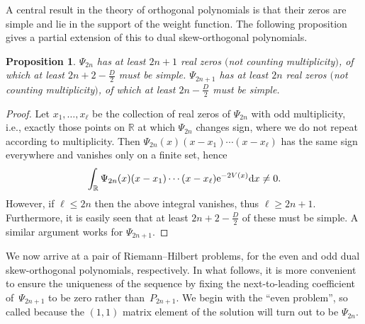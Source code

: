 \documentclass[pdftex]{sigma}
\numberwithin{equation}{section}
\newtheorem{Proposition}[Theorem]{Proposition}
\begin{document}
A central result in the theory of orthogonal polynomials is that their zeros are simple and lie in the support of the weight function. The following proposition gives a partial extension of this to dual skew-orthogonal polynomials.
\begin{Proposition}
$\Psi_{2n}$ has at least $2n+1$ real zeros $($not counting multiplicity$)$, of which at least $2n+2-\frac{D}{2}$ must be simple. $\Psi_{2n+1}$ has at least $2n$ real zeros $($not counting multiplicity$)$, of which at least $2n - \frac{D}{2}$ must be simple.
\end{Proposition}
\begin{proof}
Let $ x_1, \dots, x_\ell$ be the collection of real zeros of $\Psi_{2n}$ with odd multiplicity, i.e., exactly those points on $\mathbb{R}$ at which $\Psi_{2n}$ changes sign, where we do not repeat according to multiplicity. Then $\Psi_{2n}(x)(x-x_1)\cdots (x-x_\ell)$ has the same sign everywhere and vanishes only on a finite set, hence
\begin{equation*}
\int_\mathbb{R} \Psi_{2n}(x)(x-x_1)\cdots (x-x_\ell) {\rm e}^{-2V(x)} {\rm d}x \neq 0 .
\end{equation*}
However, if $\ell \leq 2n$ then the above integral vanishes, thus $\ell \geq 2n+1$. Furthermore, it is easily seen that at least $2n+2-\frac{D}{2}$ of these must be simple. A similar argument works for $\Psi_{2n+1}$.
\end{proof}

We now arrive at a pair of Riemann--Hilbert problems, for the even and odd dual skew-orthogonal polynomials, respectively. In what follows, it is more convenient to ensure the uniqueness of the sequence by fixing the next-to-leading coefficient of~$\Psi_{2n+1}$ to be zero rather than~$P_{2n+1}$. We begin with the \enquote{even problem}, so called because the $(1,1)$ matrix element of the solution will turn out to be $\Psi_{2n}$.
\end{document}

